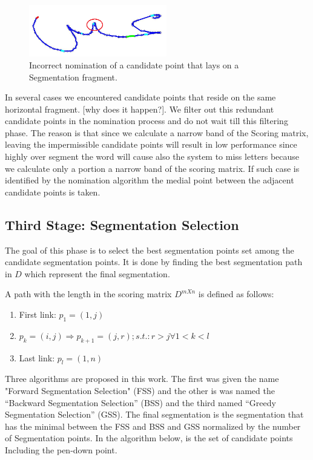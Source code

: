 \documentclass[journal,compsoc]{IEEEtran}
\begin{document}
\begin{figure}
\centering
\includegraphics[width=6cm]{./figures/candidate_in_no_horizontal}
\caption{Incorrect nomination of a candidate point that lays on a Segmentation fragment.}
\label{fig:candidate_in_no_horizontal}
\end{figure}

In several cases we encountered candidate points that reside on the same horizontal fragment. [why does it happen?]. We filter out this redundant candidate points in the nomination process and do not wait till this filtering phase. The reason is that since we calculate a narrow band of the Scoring matrix, leaving the impermissible candidate points will result in low performance since highly over segment the word will cause also the system to miss letters because we calculate only a portion a narrow band of the scoring matrix. If such case is identified by the nomination algorithm the medial point between the adjacent candidate points is taken.

\subsection{Third  Stage: Segmentation Selection}
The goal of this phase is to select the best segmentation points set among the candidate segmentation points. It is done by finding the best segmentation path in $D$ which represent the final segmentation. 
 
A path with the length in the scoring matrix $D^{mXn}$ is defined as follows:  
\begin{enumerate}
\item First link: $p_{1}=(1,j)$
\item $p_{k}=(i,j)\Rightarrow p_{k+1}=(j,r);s.t.:r>j \forall 1<k<l $
\item Last link: $p_{l}=(1,n)$
\end{enumerate}
Three algorithms are proposed in this work. The first was given the name "Forward Segmentation Selection" (FSS) and the other is was named the “Backward Segmentation Selection” (BSS) and the third named “Greedy Segmentation Selection” (GSS). The final segmentation is the segmentation that has the minimal between the FSS and BSS and GSS normalized by the number of Segmentation points. In the algorithm below, is the set of candidate points Including the pen-down point.  
\end{document}
